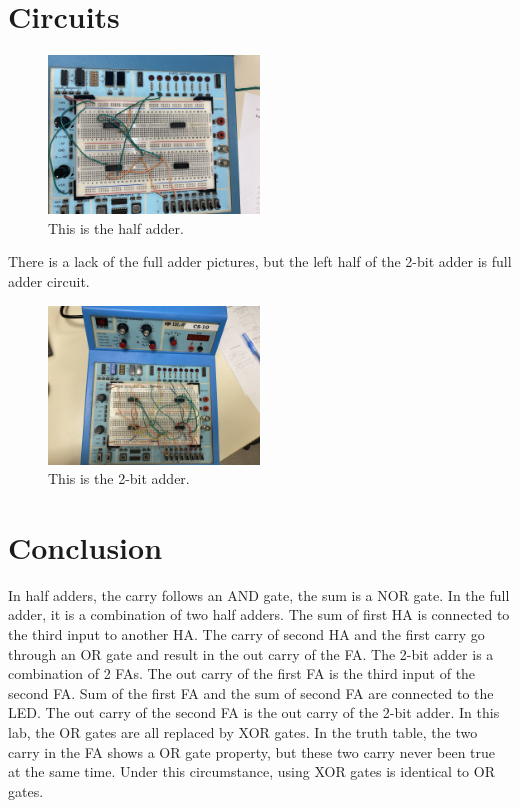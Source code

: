 \documentclass[11pt]{article}
\begin{document}
\section*{Circuits}

\begin{figure}[ht]\centering
	\includegraphics[width=0.5\textwidth]{halfadder}
	\caption{This is the half adder.}
	\label{fig:half adder}			%
\end{figure}
There is a lack of the full adder pictures, but the left half of the  2-bit adder is full adder circuit.

\begin{figure}[ht]\centering
	\includegraphics[width=0.5\textwidth]{2-bitadder}
	\caption{This is the 2-bit adder.}
	\label{fig:2-bit adder}			%
\end{figure}

\section*{Conclusion}
In half adders, the carry follows an AND gate,  the sum is a NOR gate. In the full adder, it is a combination of two half adders. The sum of  first HA is connected to the third input to another HA. The carry of  second HA and the first carry go through an OR gate and result in the out carry of the FA. The 2-bit adder is a combination of 2 FAs. The out carry of the first FA is the third input of the second FA. Sum of the first FA and the sum of second FA are connected to the LED. The out carry of the second FA is the out carry of the 2-bit adder. In this lab, the OR gates are all replaced by XOR gates. In the truth table, the two carry in the FA shows a OR gate property, but these two carry never been true at the same time. Under this circumstance, using XOR gates is identical to OR gates.
\end{document}
